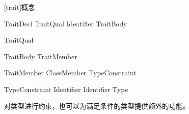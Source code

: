 
[trait]{概念}

\begin{bnf}{TraitDecl}
    TraitQual\bnfs {} Identifier TraitBody
\end{bnf}

\begin{bnf}{TraitQual}
\end{bnf}

\begin{bnf}{TraitBody}
    \terminal{\{} TraitMember\bnfs \terminal{\}}
\end{bnf}

\begin{bnf}{TraitMember}
    ClassMember \br
    TypeConstraint
\end{bnf}

\begin{bnf}{TypeConstraint}
     Identifier \terminal{;} \br
     Identifier \terminal{:} Type \terminal{;}
\end{bnf}

\pnum
{}对类型进行约束，也可以为满足条件的类型提供额外的功能。
